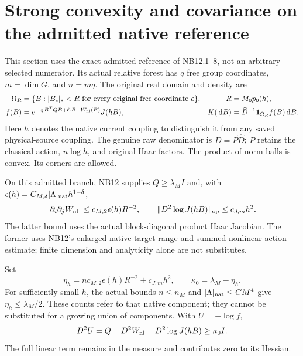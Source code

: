 \documentclass[11pt,letterpaper]{article}
\numberwithin{equation}{section}
\theoremstyle{plain}
\theoremstyle{remark}
\newcommand{\dd}{\,\mathrm d}
\newcommand{\Dhat}{\widehat D}
\begin{document}
\section{Strong convexity and covariance on the admitted native reference}
\label{sec:native}

This section uses the exact admitted reference of NB12.1--8, not an arbitrary
selected numerator. Its actual relative forest has $q$ free group coordinates,
$m=\dim G$, and $n=mq$. The original real domain and density are
\begin{align}
 \Omega_R&=\{B:|B_e|_*<R\text{ for every original free coordinate }e\},
       &R&=M_0p_0(h),\label{eq:domain}\\
 f(B)&=e^{-\frac12B^TQB+\ell\cdot B+W_{\rm nl}(B)}J(hB),
       &K(\dd B)&=\Dhat^{-1}\mathbf1_{\Omega_R}f(B)\dd B.
 \label{eq:nativedensity}
\end{align}
Here $h$ denotes the native current coupling to distinguish it from any saved
physical-source coupling. The genuine raw denominator is $D=P\Dhat$;
$P$ retains the classical action, $n\log h$, and original Haar factors.
The product of norm balls is convex. Its corners are allowed.

On this admitted branch, NB12 supplies $Q\ge\lambda_MI$ and, with
$\epsilon(h)=C_{M,\delta}|\Lambda|_{\rm nat}h^{1-\delta}$,
\[
 |\partial_i\partial_jW_{\rm nl}|\le c_{M,2}\epsilon(h)R^{-2},
 \qquad \|D^2\log J(hB)\|_{\rm op}\le c_{J,m}h^2.
\]
The latter bound uses the actual block-diagonal product Haar Jacobian.
The former uses NB12's enlarged native target range and summed nonlinear action
estimate; finite dimension and analyticity alone are not substitutes.

Set
\begin{equation}
 \eta_h=n c_{M,2}\epsilon(h)R^{-2}+c_{J,m}h^2,
 \qquad \kappa_0=\lambda_M-\eta_h.
 \label{eq:kappa}
\end{equation}
For sufficiently small $h$, the actual bounds $n\le n_M$ and
$|\Lambda|_{\rm nat}\le C M^4$ give $\eta_h\le\lambda_M/2$.
These counts refer to that native component; they cannot be substituted for a
growing union of components. With $U=-\log f$,
\begin{equation}
 D^2U=Q-D^2W_{\rm nl}-D^2\log J(hB)\ge\kappa_0I.
 \label{eq:convex}
\end{equation}
The full linear term remains in the measure and contributes zero to its Hessian.
\end{document}

